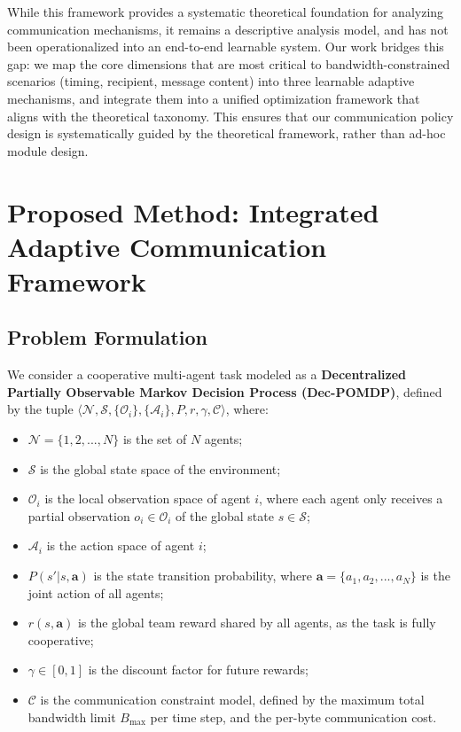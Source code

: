 \documentclass[10pt, twocolumn]{IEEEtran}
\begin{document}
While this framework provides a systematic theoretical foundation for analyzing communication mechanisms, it remains a descriptive analysis model, and has not been operationalized into an end-to-end learnable system. Our work bridges this gap: we map the core dimensions that are most critical to bandwidth-constrained scenarios (timing, recipient, message content) into three learnable adaptive mechanisms, and integrate them into a unified optimization framework that aligns with the theoretical taxonomy. This ensures that our communication policy design is systematically guided by the theoretical framework, rather than ad-hoc module design.

\section{Proposed Method: Integrated Adaptive Communication Framework}
\subsection{Problem Formulation}
We consider a cooperative multi-agent task modeled as a \textbf{Decentralized Partially Observable Markov Decision Process (Dec-POMDP)}, defined by the tuple $\langle \mathcal{N}, \mathcal{S}, \{\mathcal{O}_i\}, \{\mathcal{A}_i\}, P, r, \gamma, \mathcal{C} \rangle$, where:
\begin{itemize}
    \item $\mathcal{N} = \{1, 2, ..., N\}$ is the set of $N$ agents;
    \item $\mathcal{S}$ is the global state space of the environment;
    \item $\mathcal{O}_i$ is the local observation space of agent $i$, where each agent only receives a partial observation $o_i \in \mathcal{O}_i$ of the global state $s \in \mathcal{S}$;
    \item $\mathcal{A}_i$ is the action space of agent $i$;
    \item $P(s' | s, \boldsymbol{a})$ is the state transition probability, where $\boldsymbol{a} = \{a_1, a_2, ..., a_N\}$ is the joint action of all agents;
    \item $r(s, \boldsymbol{a})$ is the global team reward shared by all agents, as the task is fully cooperative;
    \item $\gamma \in [0, 1]$ is the discount factor for future rewards;
    \item $\mathcal{C}$ is the communication constraint model, defined by the maximum total bandwidth limit $B_{\max}$ per time step, and the per-byte communication cost.
\end{itemize}
\end{document}
